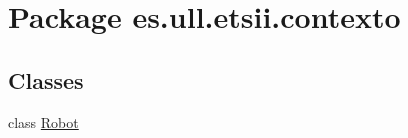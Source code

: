 \hypertarget{namespacees_1_1ull_1_1etsii_1_1contexto}{\section{Package es.\-ull.\-etsii.\-contexto}
\label{namespacees_1_1ull_1_1etsii_1_1contexto}
}
\subsection*{Classes}
\begin{DoxyCompactItemize}
\item 
class \hyperlink{classes_1_1ull_1_1etsii_1_1contexto_1_1_robot}{Robot}
\end{DoxyCompactItemize}

